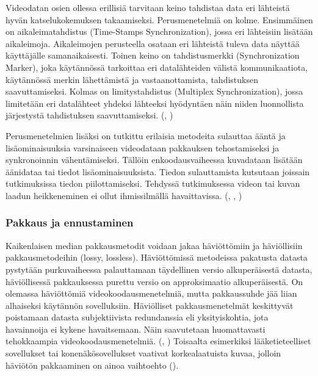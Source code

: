 Videodatan osien ollessa erillisiä tarvitaan keino tahdistaa data eri
lähteistä hyvän katselukokemuksen takaamiseksi. Perusmenetelmiä on kolme.
Ensimmäinen on aikaleimatahdistus (Time-Stamps Synchronization), jossa eri
lähteisiin lisätään aikaleimoja. Aikaleimojen perusteella osataan eri lähteistä
tuleva data näyttää käyttäjälle samanaikaisesti. Toinen keino on
tahdistusmerkki (Synchronization Marker), joka käytännössä tarkoittaa eri datalähteiden välistä
kommunikaatiota, käytännössä merkin lähettämistä ja vastaanottamista, tahdistuksen
saavuttamiseksi. Kolmas on limitystahdistus (Multiplex Synchronization), jossa
limitetään eri datalähteet yhdeksi lähteeksi hyödyntäen näin niiden
luonnollista järjestystä tahdistuksen saavuttamiseksi. (\citealt{sync}, \citealt{mujal})

Perusmenetelmien lisäksi on tutkittu erilaisia metodeita
sulauttaa ääntä ja lisäominaisuuksia varsinaiseen videodataan pakkauksen tehostamiseksi
ja synkronoinnin vähentämiseksi.
Tällöin enkoodausvaiheessa kuvadataan lisätään äänidataa tai tiedot lisäominaisuuksista.
Tiedon sulauttamista kutsutaan joissain tutkimuksissa tiedon piilottamiseksi.
Tehdyssä tutkimuksessa videon tai kuvan laadun heikkeneminen ei ollut ihmissilmällä
havaittavissa. (\citealt{sync}, \citealt{mujal}, \citealt{hiding})

\subsubsection{Pakkaus ja ennustaminen}

Kaikenlaisen median pakkausmetodit voidaan jakaa häviöttömiin
ja häviöllisiin pakkausmetodeihin (lossy, lossless). Häviöttömissä metodeissa pakatusta datasta
pystytään purkuvaiheessa palauttamaan täydellinen versio alkuperäisestä
datasta, häviöllisessä pakkauksessa purettu versio on approksimaatio
alkuperäisestä. On olemassa häviöttömiä videokoodausmenetelmiä, mutta
pakkaussuhde jää liian alhaiseksi käytännön sovelluksiin. Häviölliset
pakkausmenetelmät keskittyvät poistamaan datasta subjektiivista redundanssia
eli yksityiskohtia, jota havainnoija ei kykene havaitsemaan. Näin
saavutetaan huomattavasti tehokkaampia videokoodausmenetelmiä. (\citealt{h264}, \citealt{du})
Toisaalta esimerkiksi lääketieteelliset sovellukset tai konenäkösovellukset
vaativat korkealaatuista kuvaa, jolloin häviötön pakkaaminen on ainoa
vaihtoehto (\citealt{xu}).

